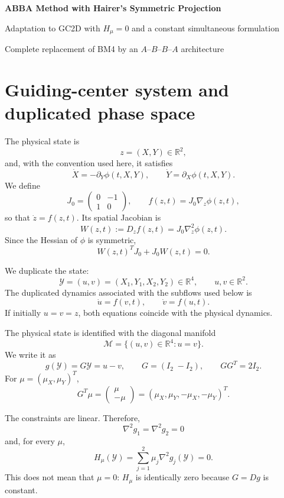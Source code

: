 \documentclass[11pt,a4paper]{article}
\newcommand{\R}{\mathbb{R}}
\newcommand{\Id}{I}
\newcommand{\Y}{\mathcal{Y}}
\newcommand{\M}{\mathcal{M}}
\begin{document}
\begin{center}
  {\LARGE\bfseries\color{blue}ABBA Method with Hairer's Symmetric Projection}\par
  \vspace{0.35em}
  {\large Adaptation to GC2D with $H_\mu=0$ and a constant simultaneous formulation}\par
  \vspace{0.45em}
  {\small Complete replacement of BM4 by an $A$--$B$--$B$--$A$ architecture}
\end{center}

\vspace{0.5em}

\section{Guiding-center system and duplicated phase space}

The physical state is
\[
 z=(X,Y)\in\R^2,
\]
and, with the convention used here, it satisfies
\[
 \dot X=-\partial_Y\phi(t,X,Y),
 \qquad
 \dot Y=\partial_X\phi(t,X,Y).
\]
We define
\[
 J_0=
 \begin{pmatrix}
  0&-1\\
  1&0
 \end{pmatrix},
 \qquad
 f(z,t)=J_0\nabla_z\phi(z,t),
\]
so that $\dot z=f(z,t)$. Its spatial Jacobian is
\[
 W(z,t):=D_zf(z,t)=J_0\nabla_z^2\phi(z,t).
\]
Since the Hessian of $\phi$ is symmetric,
\[
 W(z,t)^TJ_0+J_0W(z,t)=0. \tag{1}
\]

We duplicate the state:
\[
 \Y=(u,v)=(X_1,Y_1,X_2,Y_2)\in\R^4,
 \qquad u,v\in\R^2.
\]
The duplicated dynamics associated with the subflows used below is
\[
 \dot u=f(v,t),
 \qquad
 \dot v=f(u,t).
\]
If initially $u=v=z$, both equations coincide with the physical dynamics.

The physical state is identified with the diagonal manifold
\[
 \M=\{(u,v)\in\R^4:u=v\}.
\]
We write it as
\[
 g(\Y)=G\Y=u-v,
 \qquad
 G=(\Id_2\; -\Id_2),
 \qquad
 GG^T=2\Id_2.
\]
For $\mu=(\mu_X,\mu_Y)^T$,
\[
 G^T\mu=
 \begin{pmatrix}\mu\\-\mu\end{pmatrix}
 =(\mu_X,\mu_Y,-\mu_X,-\mu_Y)^T.
\]

The constraints are linear. Therefore,
\[
 \nabla^2g_1=\nabla^2g_2=0
\]
and, for every $\mu$,
\[
 \boxed{
 H_\mu(\Y)=\sum_{j=1}^2\mu_j\nabla^2g_j(\Y)=0.
 }
\]
This does not mean that $\mu=0$: $H_\mu$ is identically zero because $G=Dg$ is constant.
\end{document}

